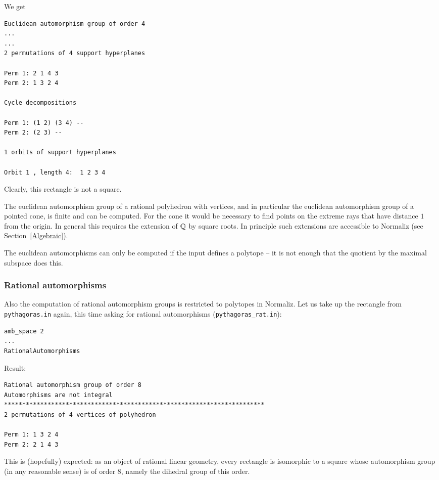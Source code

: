 We get
\begin{Verbatim}
Euclidean automorphism group of order 4
...
...
2 permutations of 4 support hyperplanes

Perm 1: 2 1 4 3
Perm 2: 1 3 2 4

Cycle decompositions 

Perm 1: (1 2) (3 4) --
Perm 2: (2 3) --

1 orbits of support hyperplanes

Orbit 1 , length 4:  1 2 3 4
\end{Verbatim}
Clearly, this rectangle is not a square.

The euclidean automorphism group of a rational polyhedron with vertices, and in particular the euclidean automorphism group of a pointed cone, is finite and can be computed. For the cone it would be necessary to find points on the extreme rays that have distance $1$ from the origin. In general this requires the extension of ${\mathbb Q}$ by square roots. In principle such extensions are accessible to Normaliz (see Section~\ref{Algebraic}).

The euclidean automorphisms can only be computed if the input defines a polytope -- it is not enough that the quotient by the maximal subspace does this.


\subsubsection{Rational automorphisms}

Also the computation of rational automorphism groups is restricted to polytopes in Normaliz. Let us take up the rectangle from \verb|pythagoras.in| again, this time asking for rational automorphisms (\verb|pythagoras_rat.in|):
\begin{Verbatim}
amb_space 2
...
RationalAutomorphisms
\end{Verbatim}

Result:
\begin{Verbatim}
Rational automorphism group of order 8
Automorphisms are not integral
************************************************************************
2 permutations of 4 vertices of polyhedron

Perm 1: 1 3 2 4
Perm 2: 2 1 4 3
\end{Verbatim}
This is (hopefully) expected: as an object of rational linear geometry, every rectangle is isomorphic to a square whose automorphism group (in any reasonable sense) is of order $8$, namely the dihedral group of this order.

